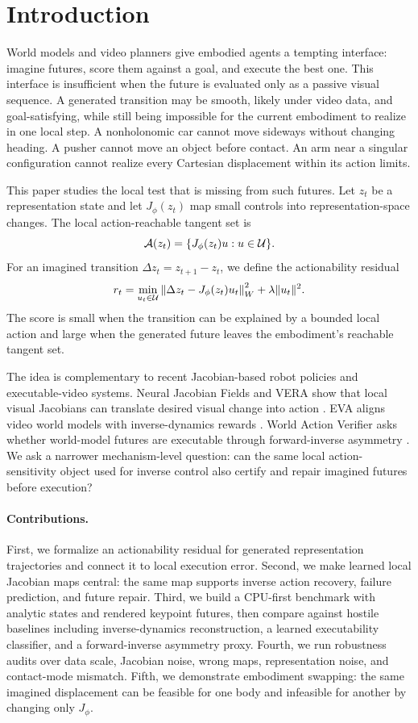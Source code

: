\section{Introduction}

World models and video planners give embodied agents a tempting interface: imagine futures, score them against a goal, and execute the best one. This interface is insufficient when the future is evaluated only as a passive visual sequence. A generated transition may be smooth, likely under video data, and goal-satisfying, while still being impossible for the current embodiment to realize in one local step. A nonholonomic car cannot move sideways without changing heading. A pusher cannot move an object before contact. An arm near a singular configuration cannot realize every Cartesian displacement within its action limits.

This paper studies the local test that is missing from such futures. Let $z_t$ be a representation state and let $J_\phi(z_t)$ map small controls into representation-space changes. The local action-reachable tangent set is
\[
\mathcal{A}(z_t)=\{J_\phi(z_t)u:u\in \mathcal{U}\}.
\]
For an imagined transition $\Delta z_t=z_{t+1}-z_t$, we define the actionability residual
\[
r_t=\min_{u_t\in \mathcal{U}}\left\|\Delta z_t-J_\phi(z_t)u_t\right\|_W^2+\lambda\|u_t\|^2.
\]
The score is small when the transition can be explained by a bounded local action and large when the generated future leaves the embodiment's reachable tangent set.

The idea is complementary to recent Jacobian-based robot policies and executable-video systems. Neural Jacobian Fields and VERA show that local visual Jacobians can translate desired visual change into action \citep{li2024jacobian,li2026vera}. EVA aligns video world models with inverse-dynamics rewards \citep{wang2026eva}. World Action Verifier asks whether world-model futures are executable through forward-inverse asymmetry \citep{liu2026wav}. We ask a narrower mechanism-level question: can the same local action-sensitivity object used for inverse control also certify and repair imagined futures before execution?

\paragraph{Contributions.}
First, we formalize an actionability residual for generated representation trajectories and connect it to local execution error. Second, we make learned local Jacobian maps central: the same map supports inverse action recovery, failure prediction, and future repair. Third, we build a CPU-first benchmark with analytic states and rendered keypoint futures, then compare against hostile baselines including inverse-dynamics reconstruction, a learned executability classifier, and a forward-inverse asymmetry proxy. Fourth, we run robustness audits over data scale, Jacobian noise, wrong maps, representation noise, and contact-mode mismatch. Fifth, we demonstrate embodiment swapping: the same imagined displacement can be feasible for one body and infeasible for another by changing only $J_\phi$.

